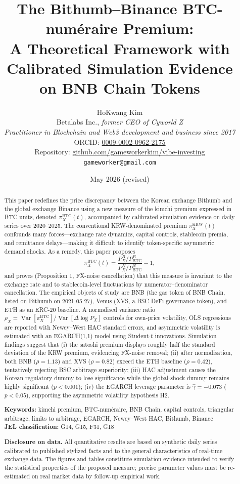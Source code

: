 \documentclass[11pt,a4paper]{article}
\title{\textbf{The Bithumb--Binance BTC-num\'eraire Premium:\\
       A Theoretical Framework with Calibrated Simulation Evidence\\
       on BNB Chain Tokens}}
\author{HoKwang Kim\\
        \small Betalabs Inc., \emph{former CEO of Cyworld Z}\\
        \small \emph{Practitioner in Blockchain and Web3 development and business since 2017}\\
        \small ORCID: \href{https://orcid.org/0009-0002-0962-2175}{0009-0002-0962-2175}\\
        \small Repository: \href{https://github.com/gameworkerkim/vibe-investing}{github.com/gameworkerkim/vibe-investing}\\
        \small \texttt{gameworker@gmail.com}}
\date{May 2026 (revised)}
\begin{document}
\maketitle

\begin{abstract}
\noindent This paper redefines the price discrepancy between the Korean exchange Bithumb and the global
exchange Binance using a new measure of the kimchi premium expressed in BTC units, denoted
$\pi^{\text{BTC}}_X(t)$, accompanied by calibrated simulation evidence on daily series over 2020--2025.
The conventional KRW-denominated premium $\pi^{\text{KRW}}_X(t)$ confounds many forces---exchange rate
dynamics, capital controls, stablecoin premia, and remittance delays---making it difficult to identify
token-specific asymmetric demand shocks. As a remedy, this paper proposes
\[
   \pi^{\text{BTC}}_X(t)=\frac{P_X^B/P_{\mathrm{BTC}}^B}{P_X^N/P_{\mathrm{BTC}}^N}-1,
\]
and proves (Proposition 1, FX-noise cancellation) that this measure is invariant to the exchange rate
and to stablecoin-level fluctuations by numerator--denominator cancellation. The empirical objects of
study are BNB (the gas token of BNB Chain, listed on Bithumb on 2021-05-27), Venus (XVS, a BSC DeFi
governance token), and ETH as an ERC-20 baseline. A normalised variance ratio
$\rho_X=\operatorname{Var}[\pi^{\text{BTC}}_X]/\operatorname{Var}[\Delta\log P_X]$
controls for own-price volatility, OLS regressions are reported with Newey--West HAC standard errors,
and asymmetric volatility is estimated with an EGARCH(1,1) model using Student-$t$ innovations.
Simulation findings suggest that (i) the satoshi premium displays roughly half the standard deviation
of the KRW premium, evidencing FX-noise removal; (ii) after normalisation, both BNB ($\rho=1.13$) and
XVS ($\rho=0.82$) exceed the ETH baseline ($\rho=0.42$), tentatively rejecting BSC arbitrage superiority;
(iii) HAC adjustment causes the Korean regulatory dummy to lose significance while the global-shock
dummy remains highly significant ($p<0.001$); (iv) the EGARCH leverage parameter is
$\hat\gamma=-0.073$ ($p<0.05$), supporting the asymmetric volatility hypothesis H2.

\medskip
\noindent\textbf{Keywords:} kimchi premium, BTC-num\'eraire, BNB Chain, capital controls,
triangular arbitrage, limits to arbitrage, EGARCH, Newey--West HAC, Bithumb, Binance \\
\textbf{JEL classification:} G14, G15, F31, G18

\medskip
\noindent\textbf{Disclosure on data.} All quantitative results are based on synthetic daily series
calibrated to published stylized facts and to the general characteristics of real-time exchange data.
The figures and tables constitute simulation evidence intended to verify the statistical properties of
the proposed measure; precise parameter values must be re-estimated on real market data by follow-up
empirical work.
\end{abstract}
\end{document}
